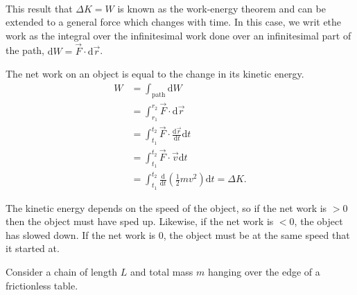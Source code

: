 \documentclass[../classical_mechanics.tex]{subfiles}
\begin{document}
        \paragraph{}
        This result that $\Delta K=W$ is known as the work-energy theorem and can be extended to a general force which changes with time.
        In this case, we writ ethe work as the integral over the infinitesimal work done over an infinitesimal part of the path, $\mathrm{d}W=\vec{F}\cdot\mathrm{d}\vec{r}$.
        \begin{theorem}
            The net work on an object is equal to the change in its kinetic energy.
            \begin{align}
                W&=\int_\mathrm{path}\mathrm{d}W\\
                &=\int_{r_1}^{r_2}\vec{F}\cdot\mathrm{d}\vec{r}\\
                &=\int_{t_1}^{t_2}\vec{F}\cdot\frac{\mathrm{d}\vec{r}}{\mathrm{d}t}\mathrm{d}t\\
                &=\int_{t_1}^{t_2}\vec{F}\cdot\vec{v}\mathrm{d}t\\
                &=\int_{t_1}^{t_2}\frac{\mathrm{d}}{\mathrm{d}t}\left(\frac{1}{2}mv^2\right)\mathrm{d}t=\Delta K.
            \end{align}
        \end{theorem}
        The kinetic energy depends on the speed of the object, so if the net work is $>0$ then the object must have sped up.
        Likewise, if the net work is $<0$, the object has slowed down.
        If the net work is 0, the object must be at the same speed that it started at.
        \begin{example}
            Consider a chain of length $L$ and total mass $m$ hanging over the edge of a frictionless table.
        \end{example}
\end{document}
